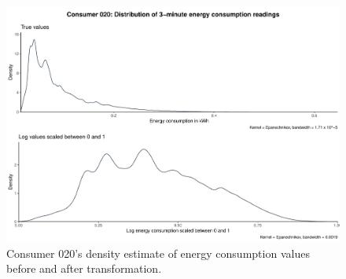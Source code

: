 \begin{centering}
\begin{figure}[!htbp]
        \includegraphics[width=\textwidth-0.85cm]{thesis/graphs/c020_density.pdf}
        \caption[Energy consumption distribution before and after transformation]{Consumer 020's density estimate of energy consumption values before and after transformation. \quantnet}
\end{figure}
\end{centering}


